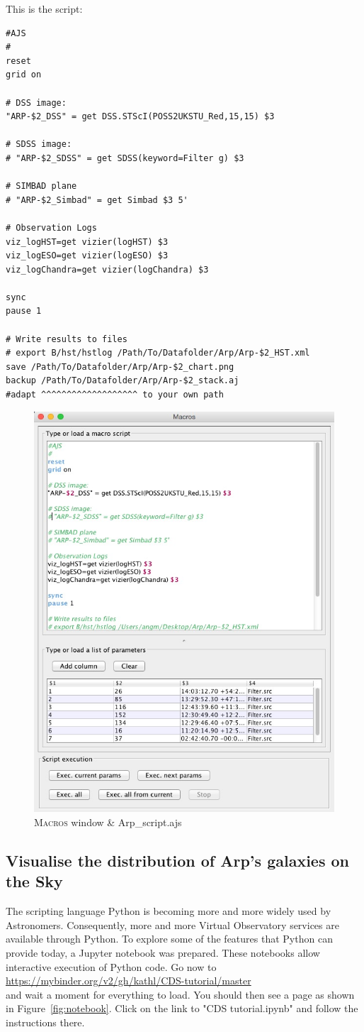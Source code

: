 \documentclass [a4paper, 12pt]{article}
\begin{document}
This is the script:
\begin{verbatim}
#AJS
#
reset
grid on

# DSS image:
"ARP-$2_DSS" = get DSS.STScI(POSS2UKSTU_Red,15,15) $3

# SDSS image:
# "ARP-$2_SDSS" = get SDSS(keyword=Filter g) $3

# SIMBAD plane
# "ARP-$2_Simbad" = get Simbad $3 5'

# Observation Logs
viz_logHST=get vizier(logHST) $3
viz_logESO=get vizier(logESO) $3
viz_logChandra=get vizier(logChandra) $3

sync
pause 1

# Write results to files
# export B/hst/hstlog /Path/To/Datafolder/Arp/Arp-$2_HST.xml
save /Path/To/Datafolder/Arp/Arp-$2_chart.png
backup /Path/To/Datafolder/Arp/Arp-$2_stack.aj
#adapt ^^^^^^^^^^^^^^^^^^^ to your own path
\end{verbatim}
\begin{figure}[H]
    \center
    \includegraphics[width=0.38 \textwidth]
    {../images/aladin_macrocontroller_cdstutorial.jpg}
    \caption{\textsc{Macros} window \& Arp\_script.ajs }
    \label{fig:script}
\end{figure}



\subsection{Visualise the distribution of Arp's galaxies on the Sky}
The scripting language Python is becoming more and more widely used by
Astronomers. Consequently, more and more Virtual Observatory services are
available through Python. To explore some of the features that Python can
provide today, a Jupyter notebook was prepared. These notebooks allow
interactive execution of Python code. Go now to\\
\url{https://mybinder.org/v2/gh/kathl/CDS-tutorial/master}\\
and wait a moment for everything to load. You should then see a page as shown
in Figure~\ref{fig:notebook}. Click on the link to "CDS tutorial.ipynb" and
follow the instructions there.
\end{document}
